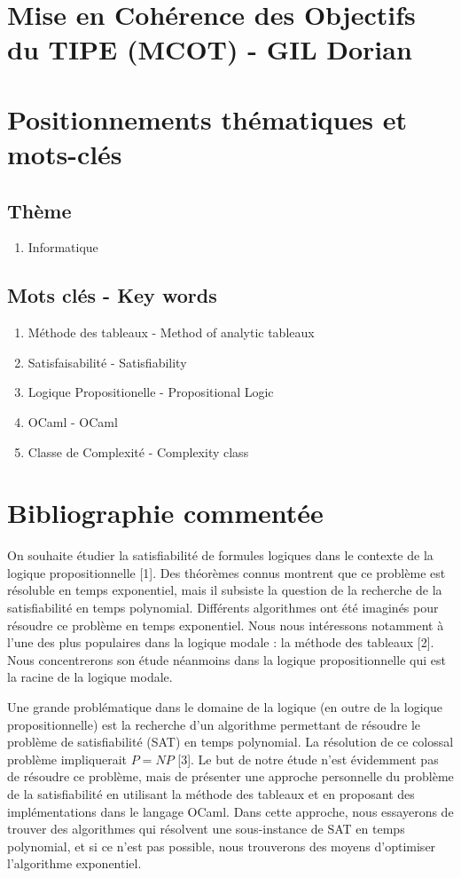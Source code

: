 \documentclass{paper}
\begin{document}
\section*{Mise en Cohérence des Objectifs du TIPE (MCOT) - GIL Dorian}

\section{Positionnements thématiques et mots-clés}
\subsection{Thème}
\begin{enumerate}
    \item Informatique
\end{enumerate}

\subsection{Mots clés - Key words}
\begin{enumerate}
    \item Méthode des tableaux - Method of analytic tableaux
    \item Satisfaisabilité - Satisfiability
    \item Logique Propositionelle - Propositional Logic
    \item OCaml - OCaml
    \item Classe de Complexité - Complexity class
\end{enumerate}

\section{Bibliographie commentée}
On souhaite étudier la satisfiabilité de formules logiques dans le contexte de la logique propositionnelle [1].  Des théorèmes connus montrent que ce
problème est résoluble en temps exponentiel, mais il subsiste la question de la recherche de la satisfiabilité en temps polynomial. Différents
algorithmes ont été imaginés pour résoudre ce problème en temps exponentiel. Nous nous intéressons notamment à l'une des plus populaires dans la
logique modale : la méthode des tableaux [2]. Nous concentrerons son étude néanmoins dans la logique propositionnelle qui est la racine de la logique 
modale.

Une grande problématique dans le domaine de la logique (en outre de la logique propositionnelle) est la recherche d'un algorithme permettant de 
résoudre le problème de satisfiabilité (SAT) en temps polynomial. La résolution de ce colossal problème impliquerait $P=NP$ [3]. Le but de notre étude
n'est évidemment pas de résoudre ce problème, mais de présenter une approche personnelle du problème de la satisfiabilité en utilisant la méthode des
tableaux et en proposant des implémentations dans le langage OCaml. Dans cette approche, nous essayerons de trouver des algorithmes qui résolvent une
sous-instance de SAT en temps polynomial, et si ce n'est pas possible, nous trouverons des moyens d'optimiser l'algorithme exponentiel.
\end{document}
